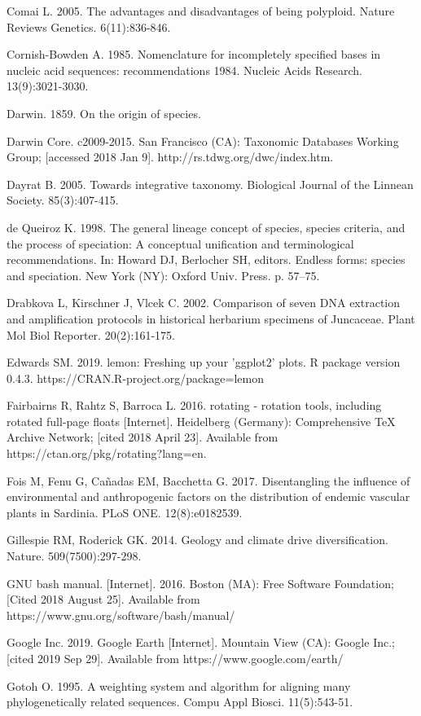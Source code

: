 Comai L. 2005. The advantages and disadvantages of being polyploid. Nature Reviews Genetics. 6(11):836-846.

Cornish-Bowden A. 1985. Nomenclature for incompletely specified bases in nucleic acid sequences: recommendations 1984.  Nucleic Acids Research. 13(9):3021-3030.

Darwin. 1859. On the origin of species.

Darwin Core. c2009-2015. San Francisco (CA): Taxonomic Databases Working Group; [accessed 2018 Jan 9]. http://rs.tdwg.org/dwc/index.htm.

Dayrat B. 2005. Towards integrative taxonomy. Biological Journal of the Linnean Society. 85(3):407-415.

de Queiroz K. 1998. The general lineage concept of species, species criteria, and the process of speciation: A conceptual unification and terminological recommendations. In: Howard DJ, Berlocher SH, editors. Endless forms: species and speciation. New York (NY): Oxford Univ. Press. p. 57–75.

Drabkova L, Kirschner J, Vlcek C. 2002. Comparison of seven DNA extraction and amplification protocols in historical herbarium specimens of Juncaceae. Plant Mol Biol Reporter. 20(2):161-175.

Edwards SM. 2019. lemon: Freshing up your 'ggplot2' plots. R package version 0.4.3. https://CRAN.R-project.org/package=lemon

Fairbairns R, Rahtz S, Barroca L. 2016. rotating - rotation tools, including rotated full-page floats [Internet]. Heidelberg (Germany): Comprehensive TeX Archive Network; [cited 2018 April 23]. Available from https://ctan.org/pkg/rotating?lang=en.

Fois M, Fenu G, Cañadas EM, Bacchetta G. 2017. Disentangling the influence of environmental and anthropogenic factors on the distribution of endemic vascular plants in Sardinia. PLoS ONE. 12(8):e0182539.

Gillespie RM, Roderick GK. 2014. Geology and climate drive diversification. Nature. 509(7500):297-298.

GNU bash manual. [Internet]. 2016. Boston (MA): Free Software Foundation; [Cited 2018 August 25]. Available from https://www.gnu.org/software/bash/manual/

Google Inc. 2019. Google Earth [Internet]. Mountain View (CA): Google Inc.; [cited 2019 Sep 29]. Available from https://www.google.com/earth/

Gotoh O. 1995. A weighting system and algorithm for aligning many phylogenetically related sequences. Compu Appl Biosci. 11(5):543-51.

